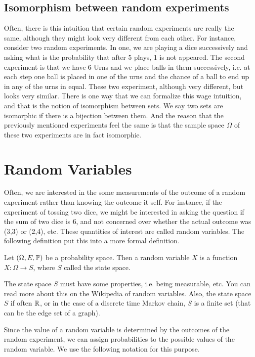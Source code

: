 \subsection{Isomorphism between random experiments}
Often, there is this intuition that certain random experiments are really the same, although they might look very different from each other. For instance, consider two random experiments. In one, we are playing a dice successively and asking what is the probability that after 5 plays, 1 is not appeared. The second experiment is that we have 6 Urns and we place balls in them successively, i.e. at each step one ball is placed in one of the urns and the chance of a ball to end up in any of the urns in equal. These two experiment, although very different, but looks very similar. There is one way that we can formalize this wage intuition, and that is the notion of isomorphism between sets. We say two sets are isomorphic if there is a bijection between them. And the reason that the previously mentioned experiments feel the same is that the sample space $\Omega$ of these two experiments are in fact isomorphic. 

\section{Random Variables}
Often, we are interested in the some measurements of the outcome of a random experiment rather than knowing the outcome it self. For instance, if the experiment of tossing two dice, we might be interested in asking the question if the sum of two dice is 6, and not concerned over whether the actual outcome was (3,3) or (2,4), etc. These quantities of interest are called random variables. The following definition put this into a more formal definition.

\begin{definition}
	Let $(\Omega, E, \mathbb{P})$ be a probability space. Then a random variable $X$ is a function $X: \Omega \to S$, where $S$ called the state space.
\end{definition}

\begin{remark}
	The state space $S$ must have some properties, i.e. being measurable, etc. You can read more about this on the Wikipedia of random variables. Also, the state space $S$ if often $\mathbb{R}$, or in the case of a discrete time Markov chain, $S$ is a finite set (that can be the edge set of a graph).
\end{remark}

Since the value of a random variable is determined by the outcomes of the random experiment, we can assign probabilities to the possible values of the random variable. We use the following notation for this purpose.

